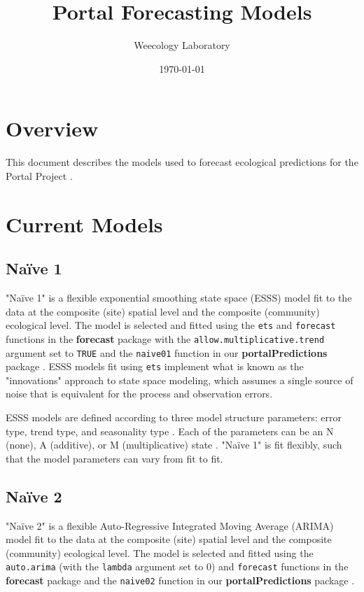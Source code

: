 \documentclass{article}
\title{Portal Forecasting Models}
\author[1]{Weecology Laboratory}
\affil[1]{University of Florida}
\date{\today}
\def\code#1{\texttt{#1}}
\begin{document}
\maketitle
\tableofcontents

\section*{Overview}
\label{sec:overview}

This document describes the models used to forecast ecological predictions for the Portal Project \cite{portal, portalpredictions}. 

\section{Current Models}
\label{sec:currmods}

\subsection{Na\"{i}ve 1}
\label{subsec:naive01}

"Na\"{i}ve 1" is a flexible exponential smoothing state space (ESSS) model \cite{esssbook} fit to the data at the composite (site) spatial level and the composite (community) ecological level. The model is selected and fitted using the \code{ets} and \code{forecast} functions in the \textbf{forecast} package \cite{forecast} with the \code{allow.multiplicative.trend} argument set to \code{TRUE} and the \code{naive01} function in our \textbf{portalPredictions} package \cite{portalpredictions}. ESSS models fit using \code{ets} implement what is known as the "innovations" approach to state space modeling, which assumes a single source of noise that is equivalent for the process and observation errors.

ESSS models are defined according to three model structure parameters: error type, trend type, and seasonality type \cite{esssbook}. Each of the parameters can be an N (none), A (additive), or M (multiplicative) state \cite{esssbook}. "Na\"{i}ve 1" is fit flexibly, such that the model parameters can vary from fit to fit.

\subsection{Na\"{i}ve 2}
\label{subsec:naive02}

"Na\"{i}ve 2" is a flexible Auto-Regressive Integrated Moving Average (ARIMA) model fit to the data at the composite (site) spatial level and the composite (community) ecological level. The model is selected and fitted using the \code{auto.arima} (with the \code{lambda} argument set to 0) and \code{forecast} functions in the \textbf{forecast} package \cite{forecast} \cite{forecastingbook} and the \code{naive02} function in our \textbf{portalPredictions} package \cite{portalpredictions}.
\end{document}

